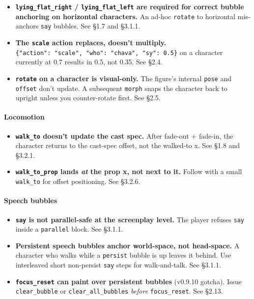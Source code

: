 \documentclass[
  11pt,
]{book}
\providecommand{\tightlist}{%
  \setlength{\itemsep}{0pt}\setlength{\parskip}{0pt}}
\begin{document}
\begin{itemize}
\tightlist
\item
  \textbf{\texttt{lying\_flat\_right} / \texttt{lying\_flat\_left} are
  required for correct bubble anchoring on horizontal characters.} An
  ad-hoc \texttt{rotate} to horizontal mis-anchors \texttt{say} bubbles.
  See §1.7 and §3.1.1.
\item
  \textbf{The \texttt{scale} action replaces, doesn't multiply.}
  \texttt{\{"action":\ "scale",\ "who":\ "chava",\ "sy":\ 0.5\}} on a
  character currently at 0.7 results in 0.5, not 0.35. See §2.4.
\item
  \textbf{\texttt{rotate} on a character is visual-only.} The figure's
  internal \texttt{pose} and \texttt{offset} don't update. A subsequent
  \texttt{morph} snaps the character back to upright unless you
  counter-rotate first. See §2.5.
\end{itemize}

\paragraph{Locomotion}\label{locomotion}

\begin{itemize}
\tightlist
\item
  \textbf{\texttt{walk\_to} doesn't update the cast spec.} After
  fade-out + fade-in, the character returns to the cast-spec offset, not
  the walked-to x. See §1.8 and §3.2.1.
\item
  \textbf{\texttt{walk\_to\_prop} lands \emph{at} the prop x, not next
  to it.} Follow with a small \texttt{walk\_to} for offset positioning.
  See §3.2.6.
\end{itemize}

\paragraph{Speech bubbles}\label{speech-bubbles}

\begin{itemize}
\tightlist
\item
  \textbf{\texttt{say} is not parallel-safe at the screenplay level.}
  The player refuses \texttt{say} inside a \texttt{parallel} block. See
  §3.1.1.
\item
  \textbf{Persistent speech bubbles anchor world-space, not head-space.}
  A character who walks while a \texttt{persist} bubble is up leaves it
  behind. Use interleaved short non-persist \texttt{say} steps for
  walk-and-talk. See §3.1.1.
\item
  \textbf{\texttt{focus\_reset} can paint over persistent bubbles}
  (v0.9.10 gotcha). Issue \texttt{clear\_bubble} or
  \texttt{clear\_all\_bubbles} \emph{before} \texttt{focus\_reset}. See
  §2.13.
\end{itemize}
\end{document}
